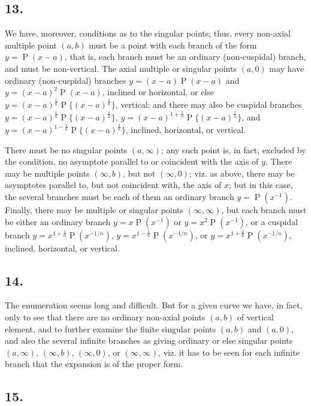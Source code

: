 \documentclass[11pt,a4paper]{article}
\theoremstyle{definition}
\DeclareMathOperator{\Pf}{P}
\begin{document}
\subsection*{13.}

We have, moreover, conditions as to the singular points; thus, every non-axial multiple point $(a, b)$ must be a point with each branch of the form $y = \Pf(x - a)$, that is, each branch must be an ordinary (non-cuspidal) branch, and must be non-vertical. The axial multiple or singular points $(a, 0)$ may have ordinary (non-cuspidal) branches $y = (x - a)\Pf(x - a)$ and $y = (x - a)^2\Pf(x - a)$, inclined or horizontal, or else $y = (x - a)^{\frac{1}{n}} \Pf\{(x - a)^{\frac{1}{n}}\}$, vertical; and there may also be cuspidal branches $y = (x - a)^{\frac{1}{n}} \Pf\{(x - a)^{\frac{1}{n}}\}$, $y = (x - a)^{1 + \frac{1}{n}} \Pf\{(x - a)^{\frac{1}{n}}\}$, and $y = (x - a)^{1 - \frac{1}{n}} \Pf\{(x - a)^{\frac{1}{n}}\}$, inclined, horizontal, or vertical.

There must be no singular points $(a, \infty)$; any such point is, in fact, excluded by the condition, no asymptote parallel to or coincident with the axis of $y$. There may be multiple points $(\infty, b)$, but not $(\infty, 0)$; viz. as above, there may be asymptotes parallel to, but not coincident with, the axis of $x$; but in this case, the several branches must be each of them an ordinary branch $y = \Pf(x^{-1})$. Finally, there may be multiple or singular points $(\infty, \infty)$, but each branch must be either an ordinary branch $y = x\Pf(x^{-1})$ or $y = x^2\Pf(x^{-1})$, or a cuspidal branch $y = x^{1 + \frac{1}{n}} \Pf(x^{-1/n})$, $y = x^{1 - \frac{1}{n}} \Pf(x^{-1/n})$, or $y = x^{1 + \frac{2}{n}} \Pf(x^{-1/n})$, inclined, horizontal, or vertical.

\subsection*{14.}

The enumeration seems long and difficult. But for a given curve we have, in fact, only to see that there are no ordinary non-axial points $(a, b)$ of vertical element, and to further examine the finite singular points $(a, b)$ and $(a, 0)$, and also the several infinite branches as giving ordinary or else singular points $(a, \infty)$, $(\infty, b)$, $(\infty, 0)$, or $(\infty, \infty)$, viz. it has to be seen for each infinite branch that the expansion is of the proper form.

\subsection*{15.}
\end{document}
